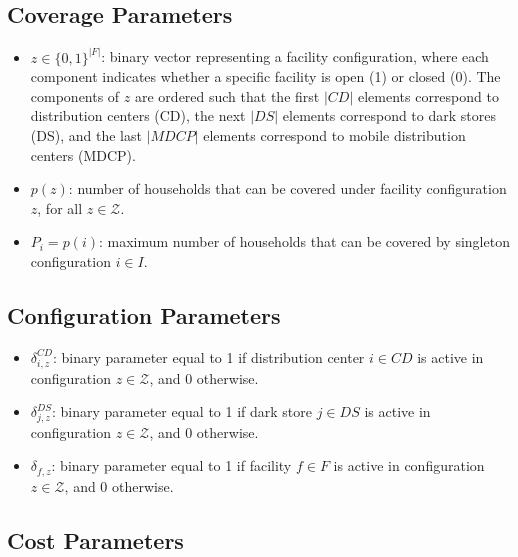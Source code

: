 \documentclass[12pt]{article}
\begin{document}
\subsection{Coverage Parameters}

\begin{itemize}
    \item $z \in \{0,1\}^{|F|}$: binary vector representing a facility configuration, where each component indicates whether a specific facility is open (1) or closed (0). The components of $z$ are ordered such that the first $|CD|$ elements correspond to distribution centers (CD), the next $|DS|$ elements correspond to dark stores (DS), and the last $|MDCP|$ elements correspond to mobile distribution centers (MDCP).
    
    \item $p(z)$: number of households that can be covered under facility configuration $z$, for all $z \in \mathcal{Z}$.
    
    \item $P_i = p(i)$: maximum number of households that can be covered by singleton configuration $i \in I$.
    
\end{itemize}

\subsection{Configuration Parameters}

\begin{itemize}
    \item $\delta^{CD}_{i,z}$: binary parameter equal to 1 if distribution center $i \in CD$ is active in configuration $z \in \mathcal{Z}$, and 0 otherwise.
    
    \item $\delta^{DS}_{j,z}$: binary parameter equal to 1 if dark store $j \in DS$ is active in configuration $z \in \mathcal{Z}$, and 0 otherwise.
    
    \item $\delta_{f,z}$: binary parameter equal to 1 if facility $f \in F$ is active in configuration $z \in \mathcal{Z}$, and 0 otherwise.
\end{itemize}

\subsection{Cost Parameters}
\end{document}
